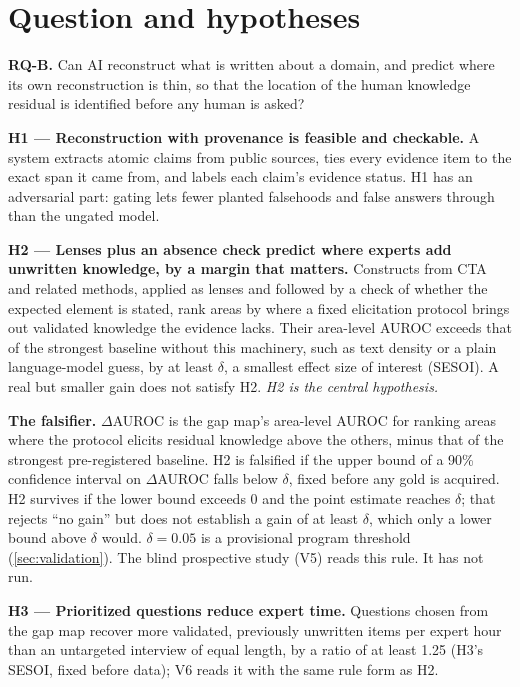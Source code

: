\section{Question and hypotheses}\label{sec:question}

\begin{keyquestionbox}
  \textbf{RQ-B.} Can AI reconstruct what is written about a domain, and predict where its own
  reconstruction is thin, so that the location of the human knowledge residual is identified before
  any human is asked?
\end{keyquestionbox}

\textbf{H1 --- Reconstruction with provenance is feasible and checkable.} A system extracts atomic
claims from public sources, ties every evidence item to the exact span it came from, and labels each
claim's evidence status. H1 has an adversarial part: gating lets fewer planted falsehoods and false answers through
than the ungated model.

\textbf{H2 --- Lenses plus an absence check predict where experts add unwritten knowledge, by a margin
that matters.} Constructs from CTA and related methods, applied as lenses and followed by a check of
whether the expected element is stated, rank areas by where a fixed elicitation protocol brings out
validated knowledge the evidence lacks. Their area-level AUROC exceeds that of the strongest baseline
without this machinery, such as text density or a plain language-model guess, by at least $\delta$, a
smallest effect size of interest (SESOI). A real but smaller gain does not satisfy H2. \emph{H2 is the
central hypothesis.}

\begin{evfutbox}[unbreakable]
  \textbf{The falsifier.} $\Delta$AUROC is the gap map's area-level AUROC for ranking areas where the
  protocol elicits residual knowledge above the others, minus that of the strongest pre-registered
  baseline. H2 is falsified if the upper bound of a 90\% confidence interval on $\Delta$AUROC falls
  below $\delta$, fixed before any gold is acquired. H2 survives if the lower bound exceeds 0 and the
  point estimate reaches $\delta$; that rejects \enquote{no gain} but does not establish a gain of at
  least $\delta$, which only a lower bound above $\delta$ would. $\delta = 0.05$ is a provisional program
  threshold (\cref{sec:validation}). The blind prospective study (V5) reads this rule. It has not run.
\end{evfutbox}

\textbf{H3 --- Prioritized questions reduce expert time.} Questions chosen from the gap map recover
more validated, previously unwritten items per expert hour than an untargeted interview of equal length,
by a ratio of at least 1.25 (H3's SESOI, fixed before data); V6 reads it with the same rule form as H2.

